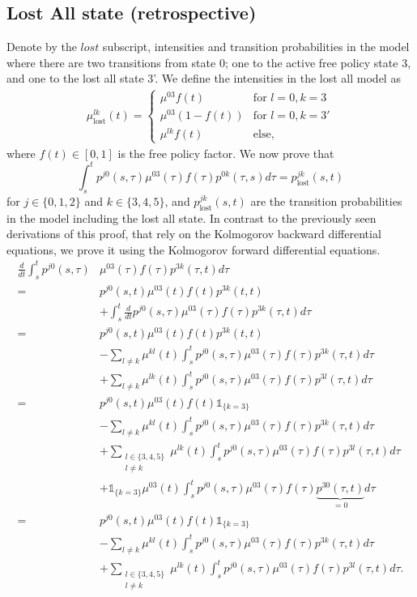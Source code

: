 \documentclass[12pt]{article}
\newcommand{\indic}[1]{\mathds{1}_{ \{ #1 \} }}
\begin{document}
\subsection*{Lost All state (retrospective)}
Denote by the $lost$ subscript, intensities and transition probabilities in the model where there are two transitions from state 0; one to the active free policy state 3, and one to the lost all state 3'. We define the intensities in the lost all model as
\begin{gather*}
\mu^{lk}_\text{lost}(t) = \begin{cases}
\mu^{03}f(t) \quad &\text{for } l=0,k=3 \\
\mu^{03}(1-f(t))  &\text{for } l=0,k=3' \\
\mu^{lk}f(t)  &\text{else},
\end{cases}
\end{gather*}
where $f(t)\in [0,1]$ is the free policy factor. We now prove that
$$
\int_s^t p^{j0}(s,\tau) \mu^{03}(\tau) f(\tau) p^{0k}(\tau,s) d\tau = p_{\text{lost}}^{jk}(s,t)
$$
for $j \in \{ 0,1,2 \}$ and $k \in \{ 3,4,5 \}$, and $p_{\text{lost}}^{jk}(s,t)$ are the transition probabilities in the model including the lost all state. In contrast to the previously seen derivations of this proof, that rely on the Kolmogorov backward differential equations, we prove it using the Kolmogorov forward differential equations.
\begin{align*}
\frac{d}{dt}\int_s^t p^{j0}(s,\tau) &\mu^{03}(\tau) f(\tau) p^{3k}(\tau,t) d\tau\\
=&
p^{j0}(s,t) \mu^{03}(t) f(t) p^{3k}(t,t)
\\
&+
\int_s^t \frac{d}{dt} p^{j0}(s,\tau) \mu^{03}(\tau) f(\tau) p^{3k}(\tau,t) d\tau
\\
=&
p^{j0}(s,t) \mu^{03}(t) f(t) p^{3k}(t,t) 
\\
& - \sum_{l \neq k} \mu^{kl}(t) \int_s^t p^{j0}(s,\tau) \mu^{03}(\tau) f(\tau) p^{3k}(\tau,t)  d\tau
\\
& + \sum_{l \neq k} \mu^{lk}(t) \int_s^t p^{j0}(s,\tau) \mu^{03}(\tau) f(\tau) p^{3l}(\tau,t) d\tau\\
=&
p^{j0}(s,t) \mu^{03}(t) f(t) \indic{k=3}
\\
& - \sum_{l \neq k} \mu^{kl}(t) \int_s^t p^{j0}(s,\tau) \mu^{03}(\tau) f(\tau) p^{3k}(\tau,t)  d\tau
\\
& + \sum_{\substack{ l \in \{3,4,5 \} \\ l \neq k}} \mu^{lk}(t) \int_s^t p^{j0}(s,\tau) \mu^{03}(\tau) f(\tau) p^{3l}(\tau,t) d\tau
\\
&+ \indic{k=3} \mu^{03}(t) \int_s^t p^{j0}(s,\tau) \mu^{03}(\tau) f(\tau) \underbrace{p^{30}(\tau,t)}_{=0} d\tau \\
=&
p^{j0}(s,t) \mu^{03}(t) f(t) \indic{k=3}
\\
& - \sum_{l \neq k} \mu^{kl}(t) \int_s^t p^{j0}(s,\tau) \mu^{03}(\tau) f(\tau) p^{3k}(\tau,t)  d\tau
\\
& + \sum_{\substack{ l \in \{3,4,5 \} \\ l \neq k}} \mu^{lk}(t) \int_s^t p^{j0}(s,\tau) \mu^{03}(\tau) f(\tau) p^{3l}(\tau,t) d\tau.
\end{align*}
\end{document}
